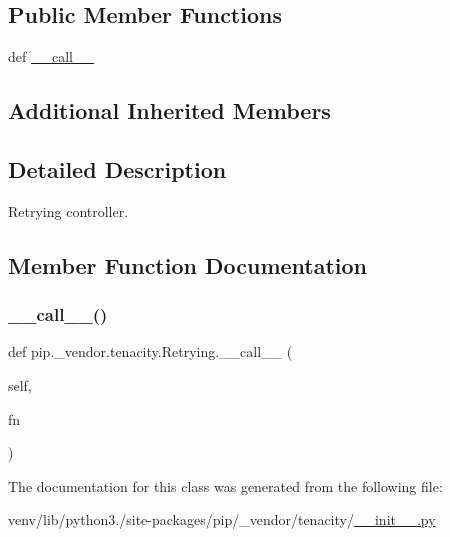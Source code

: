 \subsection*{Public Member Functions}
\begin{DoxyCompactItemize}
\item 
def \hyperlink{classpip_1_1__vendor_1_1tenacity_1_1Retrying_a807996cb4619dff726ece40e676358f2}{\+\_\+\+\_\+call\+\_\+\+\_\+}
\end{DoxyCompactItemize}
\subsection*{Additional Inherited Members}


\subsection{Detailed Description}
\begin{DoxyVerb}Retrying controller.\end{DoxyVerb}
 

\subsection{Member Function Documentation}
\mbox{\label{classpip_1_1__vendor_1_1tenacity_1_1Retrying_a807996cb4619dff726ece40e676358f2}} 
\subsubsection{\texorpdfstring{\+\_\+\+\_\+call\+\_\+\+\_\+()}{\_\_call\_\_()}}
{\footnotesize\ttfamily def pip.\+\_\+vendor.\+tenacity.\+Retrying.\+\_\+\+\_\+call\+\_\+\+\_\+ (\begin{DoxyParamCaption}\item[{}]{self,  }\item[{}]{fn }\end{DoxyParamCaption})}



The documentation for this class was generated from the following file\+:\begin{DoxyCompactItemize}
\item 
venv/lib/python3./site-\/packages/pip/\+\_\+vendor/tenacity/\hyperlink{venv_2lib_2python3_89_2site-packages_2pip_2__vendor_2tenacity_2____init_____8py}{\+\_\+\+\_\+init\+\_\+\+\_\+.\+py}\end{DoxyCompactItemize}

